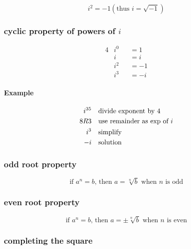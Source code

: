 \documentclass[a4paper,12pt]{article}
\begin{document}
\[ i^{2}=-1 \left( \text{thus } i=\sqrt{-1} \right) \]

\subsubsection{cyclic property of powers of \( i \) }

\begin{alignat*}{4}
&i^{0} &&= 1 \\
&i  &&= i \\
&i^{2} &&= -1 \\
&i^{3} &&= -i
\end{alignat*}

\paragraph{Example}

\begin{alignat*}{2}
    i^{35} \quad & \text{\raggedleft divide exponent by 4} \\
    8R3 \quad & \text{use remainder as exp of }i  \\
    i^{3} \quad & \text{simplify} \\
    -i \quad & \text{solution}
\end{alignat*}

\begin{center}
\end{center}

\subsubsection{odd root property}

\[ \text{if } a^{n} = b \text{, then } a = \sqrt[n]{b} \text{ when } n \text{ is odd} \]

\subsubsection{even root property}

\[ \text{if } a^{n} = b \text{, then } a = \pm\sqrt[n]{b} \text{ when } n \text{ is even} \]

\subsubsection{completing the square}
\end{document}
